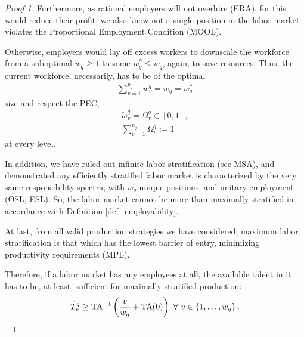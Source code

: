 \documentclass[hidelinks, nonatbib]{elsarticle}
\begin{document}
\begin{lemma}
\begin{proof}[Proof 1]
        Furthermore, as rational employers will not overhire (ERA), for this would reduce their profit, we also know not a single position in the labor market violates the Proportional Employment Condition (MOOL).
        
        Otherwise, employers would lay off excess workers to downscale the workforce from a suboptimal $w_q \geq 1$ to some $w_{q}^{*} \leq w_q$, again, to save resources. Thus, the current workforce, necessarily, has to be of the optimal
        \begin{gather}
        \sum_{v=1}^{p_q}
        w_{v}^{q}
        =
        w_q
        =
        w_{q}^{*}
        \end{gather}
        size and respect the PEC,
        \begin{gather}
        \tilde{w}_{v}^{q}
        =
        \Omega_{v}^{q}
        \in
        [0,1]
        ,
        \\
        \sum_{v=1}^{p_q}
        \Omega_{v}^{q}
        :=
        1
        \end{gather}
        at every level.
        
        In addition, we have ruled out infinite labor stratification (see MSA), and demonstrated any efficiently stratified labor market is characterized by the very same responsibility spectra, with $w_q$ unique positions, and unitary employment (OSL, ESL). So, the labor market cannot be more than maximally stratified in accordance with Definition \ref{def_employability}. 
        
        At last, from all valid production strategies we have considered, maximum labor stratification is that which has the lowest barrier of entry, minimizing productivity requirements (MPL).
        
        Therefore, if a labor market has any employees at all, the available talent in it has to be, at least, sufficient for maximally stratified production:
        \begin{gather}
            \tilde{T}_{v}^{q}
            \geq
            \text{TA}^{-1}\left(
                \frac{v}{w_q}
                +
                \text{TA}(0)
            \right)
            \
            \forall
            \
            v \in 
            \left\{
                1, \dots, w_q
            \right\}
            .
        \end{gather}
    \end{proof}


\end{lemma}
\end{document}
